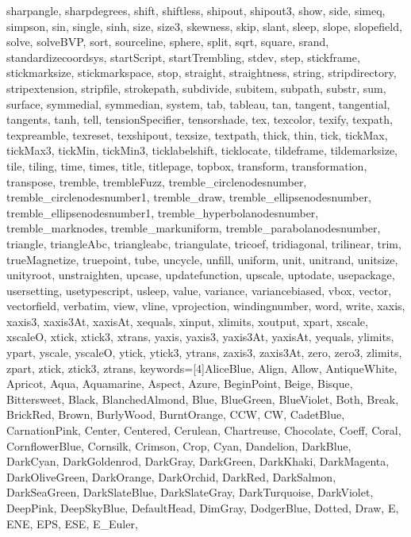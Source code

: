 {{  sharpangle, sharpdegrees, shift, shiftless, shipout, shipout3, show, side,
  simeq, simpson, sin, single, sinh, size, size3, skewness, skip, slant,
  sleep, slope, slopefield, solve, solveBVP, sort, sourceline, sphere, split,
  sqrt, square, srand, standardizecoordsys, startScript, startTrembling,
  stdev, step, stickframe, stickmarksize, stickmarkspace, stop, straight,
  straightness, string, stripdirectory, stripextension, stripfile,
  strokepath, subdivide, subitem, subpath, substr, sum, surface, symmedial,
  symmedian, system, tab, tableau, tan, tangent, tangential, tangents, tanh,
  tell, tensionSpecifier, tensorshade, tex, texcolor, texify, texpath,
  texpreamble, texreset, texshipout, texsize, textpath, thick, thin, tick,
  tickMax, tickMax3, tickMin, tickMin3, ticklabelshift, ticklocate,
  tildeframe, tildemarksize, tile, tiling, time, times, title, titlepage,
  topbox, transform, transformation, transpose, tremble, trembleFuzz,
  tremble_circlenodesnumber, tremble_circlenodesnumber1, tremble_draw,
  tremble_ellipsenodesnumber, tremble_ellipsenodesnumber1,
  tremble_hyperbolanodesnumber, tremble_marknodes, tremble_markuniform,
  tremble_parabolanodesnumber, triangle, triangleAbc, triangleabc,
  triangulate, tricoef, tridiagonal, trilinear, trim, trueMagnetize,
  truepoint, tube, uncycle, unfill, uniform, unit, unitrand, unitsize,
  unityroot, unstraighten, upcase, updatefunction, upscale, uptodate,
  usepackage, usersetting, usetypescript, usleep, value, variance,
  variancebiased, vbox, vector, vectorfield, verbatim, view, vline,
  vprojection, windingnumber, word, write, xaxis, xaxis3, xaxis3At, xaxisAt,
  xequals, xinput, xlimits, xoutput, xpart, xscale, xscaleO, xtick, xtick3,
  xtrans, yaxis, yaxis3, yaxis3At, yaxisAt, yequals, ylimits, ypart, yscale,
  yscaleO, ytick, ytick3, ytrans, zaxis3, zaxis3At, zero, zero3, zlimits,
  zpart, ztick, ztick3, ztrans},
  keywords=[4]{AliceBlue, Align, Allow, AntiqueWhite, Apricot, Aqua,
  Aquamarine, Aspect, Azure, BeginPoint, Beige, Bisque, Bittersweet, Black,
  BlanchedAlmond, Blue, BlueGreen, BlueViolet, Both, Break, BrickRed, Brown,
  BurlyWood, BurntOrange, CCW, CW, CadetBlue, CarnationPink, Center,
  Centered, Cerulean, Chartreuse, Chocolate, Coeff, Coral, CornflowerBlue,
  Cornsilk, Crimson, Crop, Cyan, Dandelion, DarkBlue, DarkCyan,
  DarkGoldenrod, DarkGray, DarkGreen, DarkKhaki, DarkMagenta, DarkOliveGreen,
  DarkOrange, DarkOrchid, DarkRed, DarkSalmon, DarkSeaGreen, DarkSlateBlue,
  DarkSlateGray, DarkTurquoise, DarkViolet, DeepPink, DeepSkyBlue,
  DefaultHead, DimGray, DodgerBlue, Dotted, Draw, E, ENE, EPS, ESE, E_Euler,
}}
